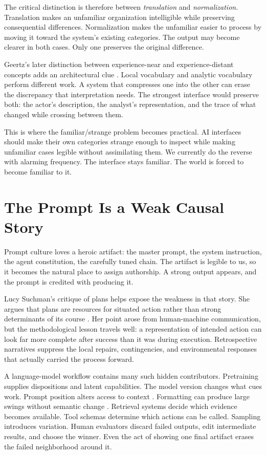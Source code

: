 \documentclass[11pt]{article}
\newcommand{\term}[1]{\textit{#1}}
\begin{document}
The critical distinction is therefore between \term{translation} and \term{normalization}. Translation makes an unfamiliar organization intelligible while preserving consequential differences. Normalization makes the unfamiliar easier to process by moving it toward the system's existing categories. The output may become clearer in both cases. Only one preserves the original difference.

Geertz's later distinction between experience-near and experience-distant concepts adds an architectural clue \citep{geertz1974native}. Local vocabulary and analytic vocabulary perform different work. A system that compresses one into the other can erase the discrepancy that interpretation needs. The strongest interface would preserve both: the actor's description, the analyst's representation, and the trace of what changed while crossing between them.

This is where the familiar/strange problem becomes practical. AI interfaces should make their own categories strange enough to inspect while making unfamiliar cases legible without assimilating them. We currently do the reverse with alarming frequency. The interface stays familiar. The world is forced to become familiar to it.

\section{The Prompt Is a Weak Causal Story}

Prompt culture loves a heroic artifact: the master prompt, the system instruction, the agent constitution, the carefully tuned chain. The artifact is legible to us, so it becomes the natural place to assign authorship. A strong output appears, and the prompt is credited with producing it.

Lucy Suchman's critique of plans helps expose the weakness in that story. She argues that plans are resources for situated action rather than strong determinants of its course \citep{suchman1987plans}. Her point arose from human-machine communication, but the methodological lesson travels well: a representation of intended action can look far more complete after success than it was during execution. Retrospective narratives suppress the local repairs, contingencies, and environmental responses that actually carried the process forward.

A language-model workflow contains many such hidden contributors. Pretraining supplies dispositions and latent capabilities. The model version changes what cues work. Prompt position alters access to context \citep{liu2024lost}. Formatting can produce large swings without semantic change \citep{sclar2024format}. Retrieval systems decide which evidence becomes available. Tool schemas determine which actions can be called. Sampling introduces variation. Human evaluators discard failed outputs, edit intermediate results, and choose the winner. Even the act of showing one final artifact erases the failed neighborhood around it.
\end{document}
